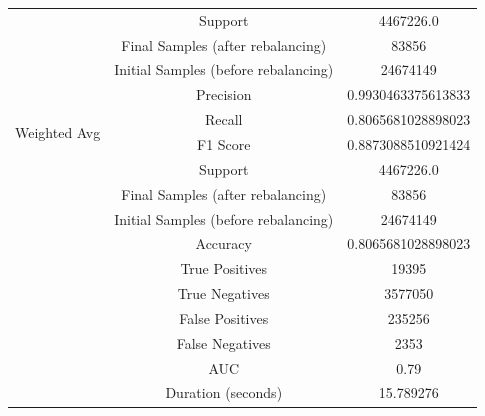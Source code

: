 \begin{longtable}{|c|c|c|}
 & Support & 4467226.0 \\
 & Final Samples (after rebalancing) & 83856 \\
 & Initial Samples (before rebalancing) & 24674149 \\
\hline
\multirow{4}{*}{Weighted Avg} & Precision & 0.9930463375613833 \\
 & Recall & 0.8065681028898023 \\
 & F1 Score & 0.8873088510921424 \\
 & Support & 4467226.0 \\
 & Final Samples (after rebalancing) & 83856 \\
 & Initial Samples (before rebalancing) & 24674149 \\
\hline
& Accuracy & 0.8065681028898023 \\ \hline
& True Positives & 19395 \\ \hline
& True Negatives & 3577050 \\ \hline
& False Positives & 235256 \\ \hline
& False Negatives & 2353 \\ \hline
& AUC & 0.79 \\ \hline
& Duration (seconds) & 15.789276 \\ \hline
\end{longtable}


